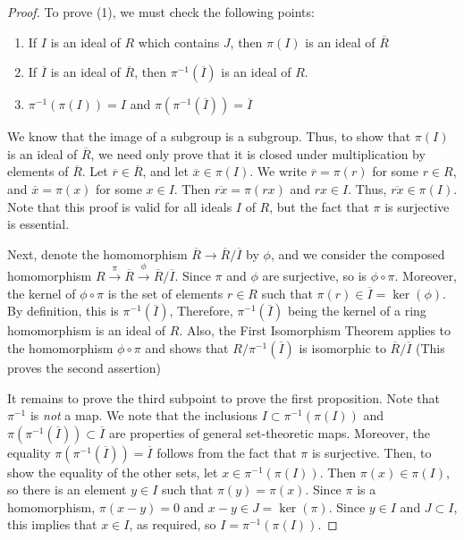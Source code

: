 \documentclass[12pt]{article}
\theoremstyle{definition}
\theoremstyle{remark}
\numberwithin{equation}{section}
\begin{document}
\begin{proof}
        To prove (1), we must check the following points: \begin{enumerate}
                \item If $I$ is an ideal of $R$ which contains $J$, then $\pi(I)$ is an ideal of $\overline{R}$
                \item If $\overline{I}$ is an ideal of $\overline{R}$, then $\pi^{-1}(\overline{I})$ is an ideal of $R$.
                \item $\pi^{-1}(\pi(I)) = I$ and $\pi(\pi^{-1}(\overline{I})) = \overline{I}$
        \end{enumerate}
        We know that the image of a subgroup is a subgroup. Thus, to show that $\pi(I)$ is an ideal of $\overline{R}$, we need only prove that it is closed under multiplication by elements of $\overline{R}$. Let $\overline{r} \in \overline{R}$, and let $\overline{x} \in \pi(I)$. We write $\overline{r} = \pi(r)$ for some $r \in R$, and $\overline{x} = \pi(x)$ for some $x \in I$. Then $\overline{rx} = \pi(rx)$ and $rx \in I$. Thus, $\overline{rx} \in \pi(I)$. Note that this proof is valid for all ideals $I$ of $R$, but the fact that $\pi$ is surjective is essential.


        Next, denote the homomorphism $\overline{R}\rightarrow \overline{R}/\overline{I}$ by $\phi$, and we consider the composed homomorphism $R \xrightarrow{\pi} \overline{R} \xrightarrow{\phi} \overline{R}/\overline{I}$. Since $\pi$ and $\phi$ are surjective, so is $\phi \circ \pi$. Moreover, the kernel of $\phi\circ \pi$ is the set of elements $r \in R$ such that $\pi(r) \in \overline{I} = \ker(\phi)$. By definition, this is $\pi^{-1}(\overline{I})$, Therefore, $\pi^{-1}(\overline{I})$ being the kernel of a ring homomorphism is an ideal of $R$. Also, the First Isomorphism Theorem applies to the homomorphism $\phi\circ \pi$ and shows that $R/\pi^{-1}(\overline{I})$ is isomorphic to $\overline{R}/\overline{I}$ (This proves the second assertion)


        It remains to prove the third subpoint to prove the first proposition. Note that $\pi^{-1}$ is \emph{not} a map. We note that the inclusions $I \subset \pi^{-1}(\pi(I))$ and $\pi(\pi^{-1}(\overline{I})) \subset \overline{I}$ are properties of general set-theoretic maps. Moreover, the equality $\pi(\pi^{-1}(\overline{I})) = \overline{I}$ follows from the fact that $\pi$ is surjective. Then, to show the equality of the other sets, let $x \in \pi^{-1}(\pi(I))$. Then $\pi(x) \in \pi(I)$, so there is an element $y \in I$ such that $\pi(y) = \pi(x)$. Since $\pi$ is a homomorphism, $\pi(x-y) = 0$ and $x-y \in J = \ker(\pi)$. Since $y \in I$ and $J \subset I$, this implies that $x \in I$, as required, so $I = \pi^{-1}(\pi(I))$.
\end{proof}
\end{document}
